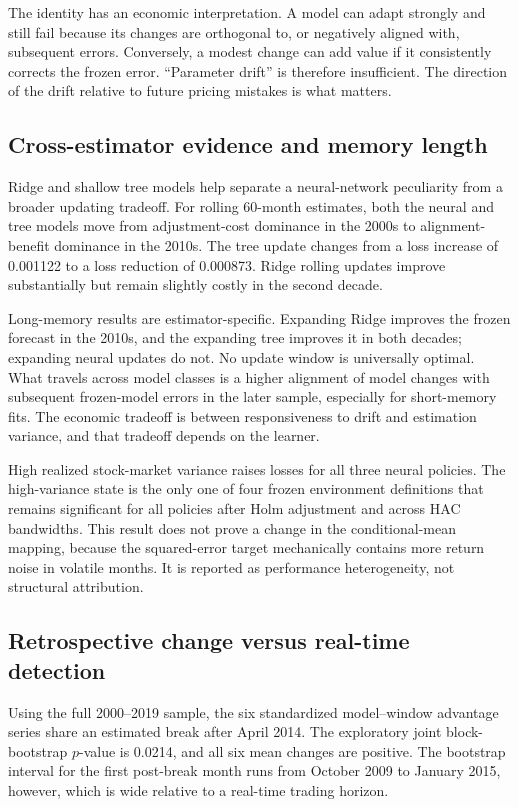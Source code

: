 

The identity has an economic interpretation. A model can adapt strongly and still fail because its changes are orthogonal to, or negatively aligned with, subsequent errors. Conversely, a modest change can add value if it consistently corrects the frozen error. ``Parameter drift'' is therefore insufficient. The direction of the drift relative to future pricing mistakes is what matters.

\subsection{Cross-estimator evidence and memory length}

Ridge and shallow tree models help separate a neural-network peculiarity from a broader updating tradeoff. For rolling 60-month estimates, both the neural and tree models move from adjustment-cost dominance in the 2000s to alignment-benefit dominance in the 2010s. The tree update changes from a loss increase of 0.001122 to a loss reduction of 0.000873. Ridge rolling updates improve substantially but remain slightly costly in the second decade.

Long-memory results are estimator-specific. Expanding Ridge improves the frozen forecast in the 2010s, and the expanding tree improves it in both decades; expanding neural updates do not. No update window is universally optimal. What travels across model classes is a higher alignment of model changes with subsequent frozen-model errors in the later sample, especially for short-memory fits. The economic tradeoff is between responsiveness to drift and estimation variance, and that tradeoff depends on the learner.

High realized stock-market variance raises losses for all three neural policies. The high-variance state is the only one of four frozen environment definitions that remains significant for all policies after Holm adjustment and across HAC bandwidths. This result does not prove a change in the conditional-mean mapping, because the squared-error target mechanically contains more return noise in volatile months. It is reported as performance heterogeneity, not structural attribution.

\subsection{Retrospective change versus real-time detection}

Using the full 2000--2019 sample, the six standardized model--window advantage series share an estimated break after April 2014. The exploratory joint block-bootstrap $p$-value is 0.0214, and all six mean changes are positive. The bootstrap interval for the first post-break month runs from October 2009 to January 2015, however, which is wide relative to a real-time trading horizon.

